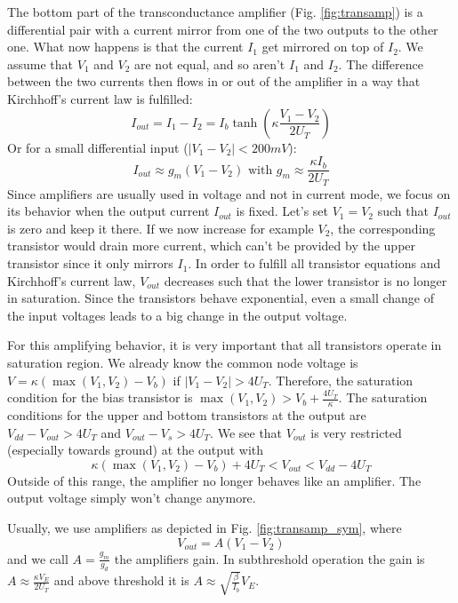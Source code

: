 \documentclass[main]{subfiles}
\begin{document}
The bottom part of the transconductance amplifier (Fig. \ref{fig:transamp}) is a differential pair with a current mirror from one of the two outputs to the other one. What now happens is that the current $I_1$ get mirrored on top of $I_2$. We assume that $V_1$ and $V_2$ are not equal, and so aren't $I_1$ and $I_2$. The difference between the two currents then flows in or out of the amplifier in a way that Kirchhoff's current law is fulfilled:
$$I_{out} = I_1 - I_2 = I_b \tanh\left(\kappa \frac{V_1-V_2}{2U_T}\right)$$
Or for a small differential input ($|V_1-V_2| < 200 mV$):
$$ I_{out} \approx g_m \left(V_1-V_2\right) \text{  with  } g_m \approx \frac{\kappa I_b}{2U_T}$$
Since amplifiers are usually used in voltage and not in current mode, we focus on its behavior when the output current $I_{out}$ is fixed. Let's set $V_1 = V_2$ such that $I_{out}$ is zero and keep it there. If we now increase for example $V_2$, the corresponding transistor would drain more current, which can't be provided by the upper transistor since it only mirrors $I_1$. In order to fulfill all transistor equations and Kirchhoff's current law, $V_{out}$ decreases such that the lower transistor is no longer in saturation. Since the transistors behave exponential, even a small change of the input voltages leads to a big change in the output voltage.
\par For this amplifying behavior, it is very important that all transistors operate in saturation region. We already know the common node voltage is 
$ V = \kappa \left(\max \left(V_1, V_2\right)-V_b \right)$ if $|V_1 - V_2| > 4U_T$. Therefore, the saturation condition for the bias transistor is
$\max \left(V_1, V_2\right) > V_b + \frac{4U_T}{\kappa}$. The saturation conditions for the upper and bottom transistors at the output are
$  V_{dd} - V_{out} > 4U_T$ and $V_{out} -V_s > 4U_T$. We see that $V_{out}$ is very restricted (especially towards ground) at the output with
$$\kappa\left(\max \left(V_1, V_2\right)- V_b\right) + 4U_T < V_{out} < V_{dd}-4U_T$$
Outside of this range, the amplifier no longer behaves like an amplifier. The output voltage simply won't change anymore.

Usually, we use amplifiers as depicted in Fig. \ref{fig:transamp_sym}, where 
$$V_{out}=A (V_1 -V_2)$$ 
and we call $A = \frac{g_m}{g_d}$ the amplifiers gain. In subthreshold operation the gain is $A \approx \frac{\kappa V_E}{2U_T}$ and above threshold it is $A \approx \sqrt{\frac{\beta}{I_b}}V_E$.
\end{document}
